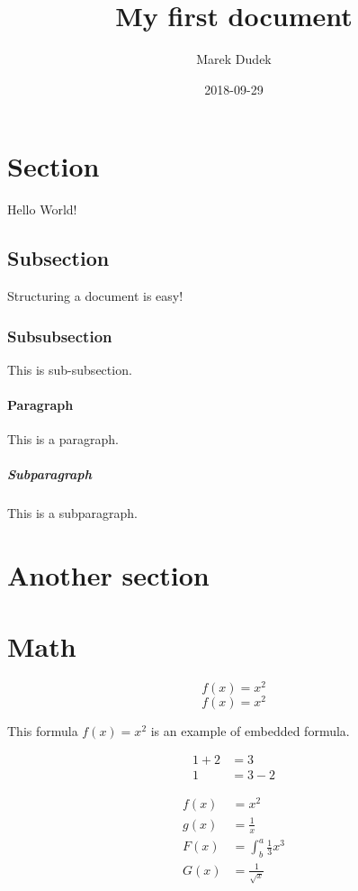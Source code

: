 \documentclass{article}
\title{My first document}
\date{2018-09-29}
\author{Marek Dudek}
\begin{document}
    \maketitle

    \newpage
    \doublespacing
    \tableofcontents
    \singlespacing

    \newpage

    \section{Section}
    Hello World!
    \subsection{Subsection}
    Structuring a document is easy!
    \subsubsection{Subsubsection}
    This is sub-subsection.
    \paragraph{Paragraph}
    This is a paragraph.
    \subparagraph{Subparagraph}
    This is a subparagraph.

    \section{Another section}

    \section{Math}

	    \begin{equation}
		f(x) = x^2
	    \end{equation}
	    \begin{equation*}
		f(x) = x^2
	    \end{equation*}

        This formula $f(x) = x^2$ is an example of embedded formula.

    \begin{align*}
 	1 + 2 &= 3\\
 	1 &= 3 - 2
    \end{align*}

    \begin{align*}
 	f(x) &= x^2\\
	g(x) &= \frac{1}{x}\\
	F(x) &= \int^a_b \frac{1}{3}x^3\\
	G(x) &= \frac{1}{\sqrt{x}}
    \end{align*}
\end{document}
